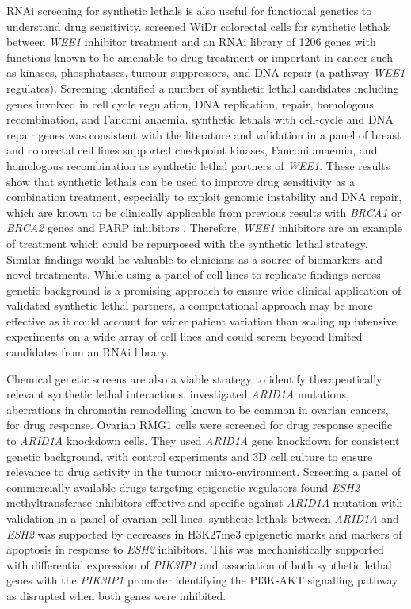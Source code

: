 \gls{RNAi} screening for \glspl{synthetic lethal} is also useful for functional genetics to understand drug sensitivity. \citet{Aarts2015} screened WiDr colorectal cells for \glspl{synthetic lethal} between \textit{WEE1} inhibitor treatment and an \gls{RNAi} library of 1206 genes with functions known to be amenable to drug treatment or important in cancer such as kinases, phosphatases, tumour suppressors, and DNA repair (a pathway \textit{WEE1} regulates). Screening identified a number of \gls{synthetic lethal} candidates including genes involved in cell cycle regulation, DNA replication, repair, homologous recombination, and Fanconi anaemia. \Glspl{synthetic lethal} with cell-cycle and DNA repair genes was consistent with the literature and validation in a panel of breast and colorectal cell lines supported checkpoint kinases, Fanconi anaemia, and homologous recombination as \gls{synthetic lethal} partners of \textit{WEE1}. These results show that \glspl{synthetic lethal} can be used to improve drug sensitivity as a combination treatment, especially to exploit genomic instability and DNA repair, which are known to be clinically applicable from previous results with \textit{BRCA1} or \textit{BRCA2} genes and PARP inhibitors \citep{Lord2014}. Therefore, \textit{WEE1} inhibitors are an example of treatment which could be repurposed with the \gls{synthetic lethal} strategy. Similar findings would be valuable to clinicians as a source of biomarkers and novel treatments. While using a panel of cell lines to replicate findings across genetic background is a promising approach to ensure wide clinical application of validated \gls{synthetic lethal} partners, a computational approach may be more effective as it could account for wider patient variation than scaling up intensive experiments on a wide array of cell lines and could screen beyond limited candidates from an \gls{RNAi} library.  

Chemical genetic screens are also a viable strategy to identify therapeutically relevant \gls{synthetic lethal} interactions. \citet{Bitler2015} investigated \textit{ARID1A} mutations, aberrations in chromatin remodelling known to be common in ovarian cancers, for drug response. Ovarian RMG1 cells were screened for drug response specific to \textit{ARID1A} knockdown cells. They used \textit{ARID1A} gene knockdown for consistent genetic background, with control experiments and 3D cell culture to ensure relevance to drug activity in the tumour micro-environment. Screening a panel of commercially available drugs targeting epigenetic regulators found \textit{ESH2} methyltransferase inhibitors effective and specific against \textit{ARID1A} mutation with validation in a panel of ovarian cell lines. \Glspl{synthetic lethal} between \textit{ARID1A} and \textit{ESH2} was supported by decreases in H3K27me3 epigenetic marks and markers of apoptosis in response to \textit{ESH2} inhibitors. This was mechanistically supported with differential expression of \textit{PIK3IP1} and association of both \gls{synthetic lethal} genes with the \textit{PIK3IP1} promoter identifying the PI3K-AKT signalling pathway as disrupted when both genes were inhibited.
 

